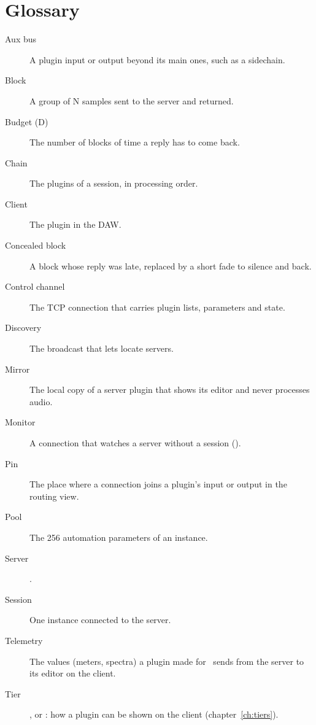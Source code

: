 \chapter{Glossary}
\label{ch:glossary}

\begin{description}
  \item[Aux bus] A plugin input or output beyond its main ones, such as a
    sidechain.
  \item[Block] A group of N samples sent to the server and returned.
  \item[Budget (D)] The number of blocks of time a reply has to come back.
  \item[Chain] The plugins of a session, in processing order.
  \item[Client] The  plugin in the DAW.
  \item[Concealed block] A block whose reply was late, replaced by a short
    fade to silence and back.
  \item[Control channel] The TCP connection that carries plugin lists,
    parameters and state.
  \item[Discovery] The broadcast that lets  locate servers.
  \item[Mirror] The local copy of a server plugin that shows its editor and
    never processes audio.
  \item[Monitor] A connection that watches a server without a session
    ().
  \item[Pin] The place where a connection joins a plugin's input or output
    in the routing view.
  \item[Pool] The 256 automation parameters of an  instance.
  \item[Server] .
  \item[Session] One  instance connected to the server.
  \item[Telemetry] The values (meters, spectra) a plugin made for \fxme\ sends
    from the server to its editor on the client.
  \item[Tier] ,  or : how a plugin can be shown on the
    client (chapter~\ref{ch:tiers}).
\end{description}
